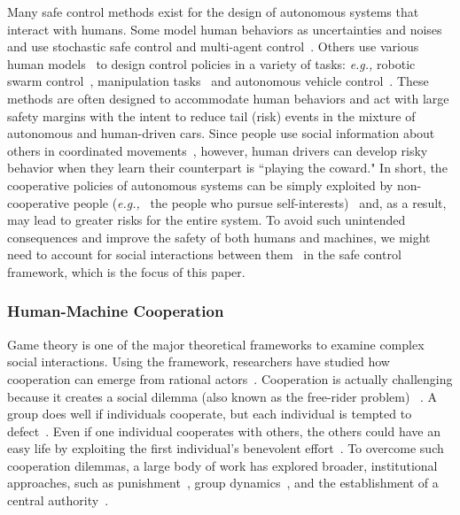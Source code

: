 \documentclass[letterpaper]{article} %
\newcommand{\eg}{\textit{e.g., }}
\begin{document}
Many safe control methods exist for the design of autonomous systems that interact with humans. Some model human behaviors as uncertainties and noises and use stochastic safe control and multi-agent control~\cite{ahmadi2019safe,luo2020multi,lyu2021probabilistic,cheng2020safe}. Others use various human models~\cite{kulic2007affective,ding2011human,kelley2008understanding,ravichandar2018gaze,koppula2015anticipating} to design control policies in a variety of tasks: \eg robotic swarm control~\cite{atman2018motion,diaz2017human}, manipulation tasks~\cite{erhart2016model,peng2018collaborative} and autonomous vehicle control~\cite{cummings2011impact}. These methods are often designed to accommodate human behaviors and act with large safety margins with the intent to reduce tail (risk) events in the mixture of autonomous and human-driven cars. Since people use social information about others in coordinated movements~\cite{Faria2010-uq}, however, human drivers can develop risky behavior when they learn their counterpart is ``playing the coward." In short, the cooperative policies of autonomous systems can be simply exploited by non-cooperative people (\eg~the people who pursue self-interests)~\cite{Ishowo-Oloko2019-vn,Dawes1980-il,Shirado2020-hs} and, as a result, may lead to greater risks for the entire system. To avoid such unintended consequences and improve the safety of both humans and machines, we might need to account for social interactions between them~\cite{Chen2017-ns} in the safe control framework, which is the focus of this paper.

\subsubsection{Human-Machine Cooperation}

Game theory is one of the major theoretical frameworks to examine complex social interactions. Using the framework, researchers have studied how cooperation can emerge from rational actors~\cite{Axelrod1984-pg}. Cooperation is actually challenging because it creates a social dilemma (also known as the free-rider problem) ~\cite{Dawes1980-il}. A group does well if individuals cooperate, but each individual is tempted to defect~\cite{Olson1965-bc}. Even if one individual cooperates with others, the others could have an easy life by exploiting the first individual's benevolent effort~\cite{Nowak2006-bl}. To overcome such cooperation dilemmas, a large body of work has explored broader, institutional approaches, such as punishment~\cite{Fehr2002-ur}, group dynamics~\cite{Shirado2013-nl}, and the establishment of a central authority~\cite{Ostrom1990-wp}.
\end{document}
